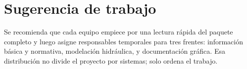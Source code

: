 \documentclass[11pt]{article}
\begin{document}
\section{Sugerencia de trabajo}
\begin{warnbox}
Se recomienda que cada equipo empiece por una lectura r\'apida del paquete completo y luego asigne responsables temporales para tres frentes: informaci\'on b\'asica y normativa, modelaci\'on hidr\'aulica, y documentaci\'on gr\'afica. Esa distribuci\'on no divide el proyecto por sistemas; solo ordena el trabajo.
\end{warnbox}
\end{document}

